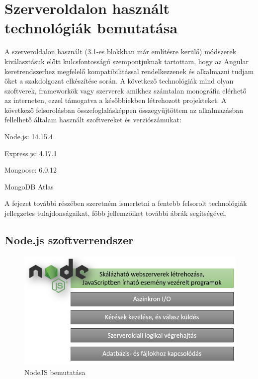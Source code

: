 \section{Szerveroldalon használt technológiák bemutatása}
A szerveroldalon használt (3.1-es blokkban már említésre kerülő) módszerek kiválasztásuk előtt kulcsfontosságú szempontjuknak tartottam, hogy az Angular keretrendszerhez megfelelő kompatibilitással rendelkezzenek és alkalmazni tudjam őket a szakdolgozat elkészítése során. A következő technológiák mind olyan szoftverek, frameworkök vagy szerverek amikhez számtalan monográfia elérhető az interneten, ezzel támogatva a későbbiekben létrehozott projekteket. A következő felsorolásban összefoglalásképpen összegyűjtöttem az alkalmazásban fellelhető általam használt szoftvereket és verziószámukat:

\begin{compactitem}
	\item Node.js: 14.15.4
	\item Express.js: 4.17.1
	\item Mongoose: 6.0.12
	\item MongoDB Atlas
\end{compactitem}

\bigskip
A fejezet további részében szeretném ismertetni a fentebb felsorolt technológiák jellegzetes tulajdonságaikat, főbb jellemzőiket további ábrák segítségével.

\subsection{Node.js szoftverrendszer}

\begin{figure}[H]
	\centering
	\includegraphics[width=1.0\textwidth,height=220px]{images/nodejs_bemutatasa.png}
	\caption{NodeJS bemutatása}
	\label{fig.picture-3}
\end{figure}


